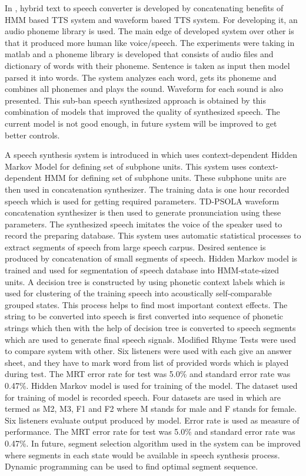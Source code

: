 In \cite{ganai2016text}, hybrid text to speech converter is developed by
concatenating benefits of HMM based TTS system and waveform based TTS system. For developing it, an audio phoneme library is used. The main
edge of developed system over other is that it produced more human like voice/speech. The experiments were taking in
matlab and a phoneme library is developed that consists of audio files and dictionary of words with their phoneme. Sentence is
taken as input then model parsed it into words. The system analyzes each word, gets its phoneme and combines all phonemes
and plays the sound. Waveform for each sound is also presented. This sub-ban speech synthesized approach is obtained by
this combination of models that improved the quality of synthesized speech. The current model is not good enough, in future
system will be improved to get better controls.

A speech synthesis system is introduced in \cite{donovan1995improvements} which uses context-dependent Hidden Markov Model for defining set of subphone units. This system uses context-dependent HMM for defining set of subphone units. These subphone units are then used in concatenation synthesizer. The training data is one hour recorded speech which is used for getting required parameters. TD-PSOLA waveform concatenation synthesizer is then used to generate pronunciation using these parameters. The synthesized speech imitates the voice of the speaker used to record the preparing database. This system uses automatic statistical processes to extract segments of speech from large speech carpus. Desired sentence is produced by concatenation of small segments of speech. Hidden Markov model is trained and used for segmentation of speech database into HMM-state-sized units. A decision tree is constructed by using phonetic context labels which is used for clustering of the training speech into acoustically self-comparable grouped states. This process helps to find most important context effects. The string to be converted into speech is first converted into sequence of phonetic strings which then with the help of decision tree is converted to speech segments which are used to generate final speech signals. Modified Rhyme Tests \cite{house1965articulation} were used to compare system with other. Six listeners were used with each give an answer sheet, and they have to mark word from list of provided words which is played during test. The MRT error rate for test was 5.0\% and standard error rate was 0.47\%. Hidden Markov model is used for training of the model. The dataset used for training of model is recorded speech. Four datasets are used in which are termed as M2, M3, F1 and F2 where M stands for male and F stands for female. Six listeners evaluate output produced by model. Error rate is used as measure of performance. The MRT error rate for test was 5.0\% and standard error rate was 0.47\%. In future, segment selection algorithm used in the system can be improved where segments in each state would be available in speech synthesis process. Dynamic programming can be used to find optimal segment sequence.

